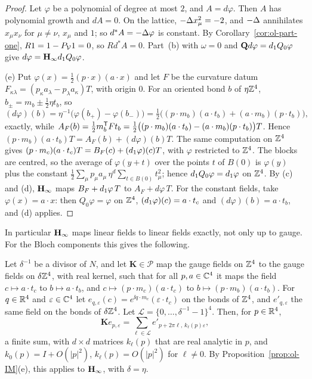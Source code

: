 \begin{proof}
Let $\varphi$ be a polynomial of degree at most $2$, and $A=d\varphi$. Then $A$ has polynomial growth and $dA=0$. On the lattice, $-\Delta x_\mu^2=-2$, and $-\Delta$ annihilates $x_\mu x_\nu$ for $\mu\ne\nu$, $x_\mu$ and $1$; so $d^*A=-\Delta\varphi$ is constant. By Corollary~\ref{cor:ol-part-one}, $R1=1-P_\mathcal V1=0$, so $Rd^*A=0$. Part~(b) with $\omega=0$ and $\mathbf Q d\varphi=d_1 Q_0\varphi$ give $d\varphi=\mathbf H_\infty d_1 Q_0\varphi$.

(e) Put $\varphi(x)=\frac12(p\cdot x)(a\cdot x)$ and let $F$ be the curvature datum $F_{\kappa\lambda}=(p_\kappa a_\lambda-p_\lambda a_\kappa)T$, with origin $0$. For an oriented bond $b$ of $\eta\mathbb Z^4$, $b_\pm=m_b\pm\frac12\eta t_b$, so
\[
(d\varphi)(b)=\eta^{-1}\big(\varphi(b_+)-\varphi(b_-)\big)=\tfrac12\big((p\cdot m_b)(a\cdot t_b)+(a\cdot m_b)(p\cdot t_b)\big),
\]
exactly, while $A_F(b)=\frac12m_b^{\sf T}Ft_b=\frac12\big((p\cdot m_b)(a\cdot t_b)-(a\cdot m_b)(p\cdot t_b)\big)T$. Hence $(p\cdot m_b)(a\cdot t_b)T=A_F(b)+(d\varphi)(b)T$. The same computation on $\mathbb Z^4$ gives $(p\cdot m_c)(a\cdot t_c)T=B_F(c)+(d_1\varphi)(c)T$, with $\varphi$ restricted to $\mathbb Z^4$. The blocks are centred, so the average of $\varphi(y+t)$ over the points $t$ of $B(0)$ is $\varphi(y)$ plus the constant $\frac12\sum_\mu p_\mu a_\mu\,\eta^d\sum_{t\in B(0)}t_\mu^2$; hence $d_1 Q_0\varphi=d_1\varphi$ on $\mathbb Z^4$. By (c) and (d), $\mathbf H_\infty$ maps $B_F+d_1\varphi\,T$ to $A_F+d\varphi\,T$. For the constant fields, take $\varphi(x)=a\cdot x$: then $Q_0\varphi=\varphi$ on $\mathbb Z^4$, $(d_1\varphi)(c)=a\cdot t_c$ and $(d\varphi)(b)=a\cdot t_b$, and (d) applies.
\end{proof}

In particular $\mathbf H_\infty$ maps linear fields to linear fields exactly, not only up to gauge. For the Bloch components this gives the following.

\begin{corollary}\label{cor:ol-umklapp}
Let $\delta^{-1}$ be a divisor of $N$, and let $\mathbf K\in\mathscr P$ map the gauge fields on $\mathbb Z^4$ to the gauge fields on $\delta\mathbb Z^4$, with real kernel, such that for all $p,a\in\mathbb C^4$ it maps the field $c\mapsto a\cdot t_c$ to $b\mapsto a\cdot t_b$, and $c\mapsto(p\cdot m_c)(a\cdot t_c)$ to $b\mapsto(p\cdot m_b)(a\cdot t_b)$. For $q\in\mathbb R^4$ and $\varepsilon\in\mathbb C^4$ let $e_{q,\varepsilon}(c)=e^{\ii q\cdot m_c}(\varepsilon\cdot t_c)$ on the bonds of $\mathbb Z^4$, and $e'_{q,\varepsilon}$ the same field on the bonds of $\delta\mathbb Z^4$. Let $\mathcal L=\{0,\dots,\delta^{-1}-1\}^4$. Then, for $p\in\mathbb R^4$,
\[
\mathbf Ke_{p,\varepsilon}=\sum_{\ell\in\mathcal L}e'_{p+2\pi\ell,\,k_\ell(p)\varepsilon},
\]
a finite sum, with $d\times d$ matrices $k_\ell(p)$ that are real analytic in $p$, and $k_0(p)=I+O(|p|^2)$, $k_\ell(p)=O(|p|^2)$ for $\ell\ne0$. By Proposition~\ref{prop:ol-IM}(e), this applies to $\mathbf H_\infty$, with $\delta=\eta$.
\end{corollary}

